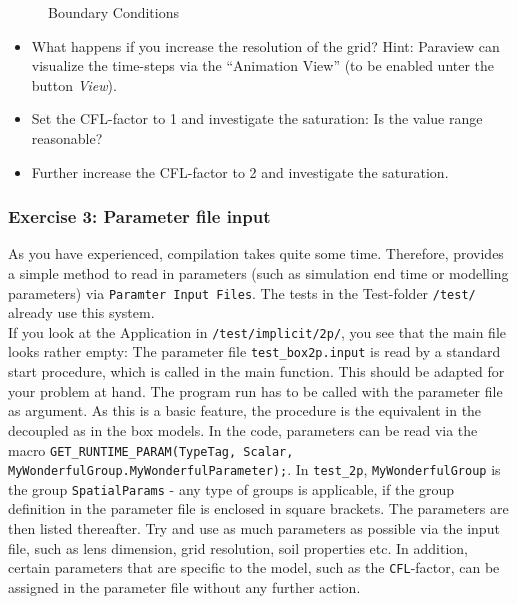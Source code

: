 \begin{figure}[ht]
\centering
{}
\caption{Boundary Conditions}\label{tutorial-decoupled:ex2_BC}
\end{figure}

\begin{itemize}
 \item What happens if you increase the resolution of the grid? Hint: Paraview
 can visualize the time-steps via the ``Animation View'' (to be enabled unter the button \textit{View}).
 \item Set the CFL-factor to 1 and investigate the saturation: Is the value range reasonable?
 \item Further increase the CFL-factor to 2 and investigate the saturation.
\end{itemize}

\subsubsection{Exercise 3: Parameter file input}
As you have experienced, compilation takes quite some time. Therefore, \Dumux
provides a simple method to read in parameters (such as simulation end time or
modelling parameters) via \texttt{Paramter Input Files}. The tests in the Test-folder
\texttt{/test/} already use this system.\\
If you look at the Application in \texttt{/test/implicit/2p/}, you see that
the main file looks rather empty: The parameter file \texttt{test\_box2p.input}
is read by a standard start procedure, which is called in the main function.
This should be adapted for your problem at hand. The program run has to be
called with the parameter file as argument. As this is a basic \Dumux feature,
the procedure is the equivalent in the decoupled as in the box models.
In the code, parameters can be read via the macro
\texttt{GET\_RUNTIME\_PARAM(TypeTag, Scalar, MyWonderfulGroup.MyWonderfulParameter);}.
In \texttt{test\_2p}, \texttt{MyWonderfulGroup} is the group \texttt{SpatialParams}
- any type of groups is applicable, if the group definition in the parameter file
is enclosed in square brackets. The parameters are then listed thereafter.
Try and use as much parameters as possible via the input file, such as lens
dimension, grid resolution, soil properties etc. In addition, certain parameters
that are specific to the model, such as the \texttt{CFL}-factor, can be assigned
in the parameter file without any further action.

